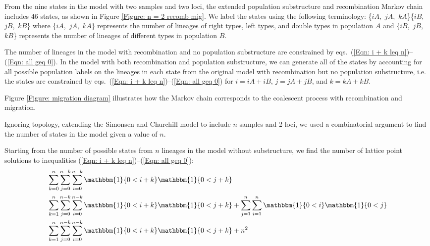 \documentclass[11pt,oneside]{amsart}
\begin{document}
From the nine states in the \cite{SimonsenChurchill1997} model with two samples and two loci, the extended population substructure and recombination Markov chain includes 46 states, as shown in Figure \ref{Figure: n = 2 recomb mig}. We label the states using the following terminology: \mbox{\{$iA$, $jA$, $kA$\}\{$iB$, $jB$, $kB$\}} where \mbox{\{$iA$, $jA$, $kA$\}} represents the number of lineages of right types, left types, and double types in population $A$ and \mbox{\{$iB$, $jB$, $kB$\}} represents the number of lineages of different types in population $B$.

The number of lineages in the model with recombination and no population substructure are constrained by eqs.~(\ref{Eqn: i + k leq n})--(\ref{Eqn: all geq 0}). In the model with both recombination and population substructure, we can generate all of the states by accounting for all possible population labels on the lineages in each state from the original model with recombination but no population substructure, i.e. the states are constrained by eqs.~(\ref{Eqn: i + k leq n})--(\ref{Eqn: all geq 0}) for $i = iA + iB$, $j = jA + jB$, and $k = kA + kB$.

Figure \ref{Figure: migration diagram} illustrates how the Markov chain corresponds to the coalescent process with recombination and migration.



Ignoring topology, extending the Simonsen and Churchill model to include $n$ samples and 2 loci,  we used a combinatorial argument to find the number of states in the model given a value of $n$. 

Starting from the number of possible states from $n$ lineages in the model without substructure, we find the number of lattice point solutions to inequalities (\ref{Eqn: i + k leq n})--(\ref{Eqn: all geq 0}):
\begin{align}
& \sum^{n}_{k = 0} \sum^{n-k}_{j = 0} \sum^{n-k}_{i = 0}  \mathbbm{1}\{0 < i + k\}\mathbbm{1}\{0 < j + k\} \\
& \sum^{n}_{k = 1} \sum^{n-k}_{j = 0} \sum^{n-k}_{i = 0}  \mathbbm{1}\{0 < i + k\}\mathbbm{1}\{0 < j + k\} + \sum^{n}_{j = 1} \sum^{n}_{i = 1}  \mathbbm{1}\{0 < i\}\mathbbm{1}\{0 < j\} \\
& \sum^{n}_{k = 1} \sum^{n-k}_{j = 0} \sum^{n-k}_{i = 0}  \mathbbm{1}\{0 < i + k\}\mathbbm{1}\{0 < j + k\} + n^2
\end{align}
\end{document}
